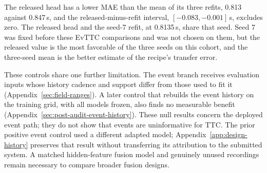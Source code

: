 The released head has a lower MAE than the mean of its three refits, 0.813 against 0.847\,s, and the released-minus-refit interval, $[-0.083,-0.001]$\,s, excludes zero. The released head and the seed-7 refit, at 0.8135\,s, share that seed. Seed 7 was fixed before these EvTTC comparisons and was not chosen on them, but the released value is the most favorable of the three seeds on this cohort, and the three-seed mean is the better estimate of the recipe's transfer error.

These controls share one further limitation. The event branch receives evaluation inputs whose history cadence and support differ from those used to fit it (Appendix~\ref{sec:field-ranges}). A later control that rebuilds the event history on the training grid, with all models frozen, also finds no measurable benefit (Appendix~\ref{sec:post-audit-event-history}). These null results concern the deployed event path; they do not show that events are uninformative for TTC. The prior positive event control used a different adapted model; Appendix~\ref{app:design-history} preserves that result without transferring its attribution to the submitted system. A matched hidden-feature fusion model and genuinely unused recordings remain necessary to compare broader fusion designs.
\FloatBarrier
